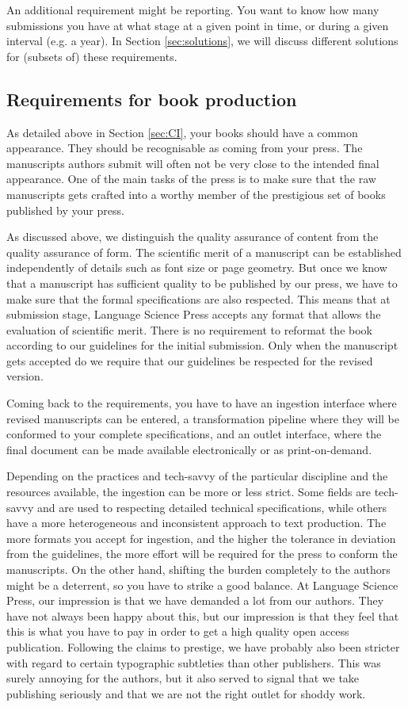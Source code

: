 \documentclass[nonflat,smallfont
]{langsci/langscibook}
\begin{document}
An additional requirement might be reporting. You want to know how many submissions you have at what stage at a given point in time, or during a given interval (e.g. a year). In Section \ref{sec:solutions}, we will discuss different solutions for (subsets of) these requirements. 
 
 
\subsection{Requirements for book production}
As detailed above in Section \ref{sec:CI}, your books should have a common appearance. They should be recognisable as coming from your press. The manuscripts authors submit will often not be very close to the intended final appearance. One of the main tasks of the press is to make sure that the raw manuscripts gets crafted into a worthy member of the prestigious set of books published by your press. 

As discussed above, we distinguish the quality assurance of content from the quality assurance of form. The scientific merit of a manuscript can be established independently of details such as font size or page geometry. But once we know that a manuscript has sufficient quality to be published by our press, we have to make sure that the formal specifications are also respected. This means that at submission stage, Language Science Press accepts any format that allows the evaluation of scientific merit. There is no requirement to reformat the book according to our guidelines for the initial submission. Only when the manuscript gets accepted do we require that our guidelines be respected for the revised version. 

Coming back to the requirements, you have to have an ingestion interface where revised manuscripts can be entered, a transformation pipeline where they will be conformed to your complete specifications, and an outlet interface, where the final document can be made available electronically or as print-on-demand.

Depending on the practices and tech-savvy of the particular discipline and the resources available, the ingestion can be more or less strict. Some fields are tech-savvy and are used to respecting detailed technical specifications, while others have a more heterogeneous and inconsistent approach to text production. The more formats you accept for ingestion, and the higher the tolerance in deviation from the guidelines, the more effort will be required for the press to conform the manuscripts. On the other hand, shifting the burden completely to the authors might be a deterrent, so you have to strike a good balance. At Language Science Press, our impression is that we have demanded a lot from our authors. They have not always been happy about this, but our impression is that they feel that this is what you have to pay in order to get a high quality open access publication. Following the claims to prestige, we have probably also been stricter with regard to certain typographic subtleties than other publishers. This was surely annoying for the authors, but it also served to signal that we take publishing seriously and that we are not the right outlet for shoddy work. 
\end{document}
